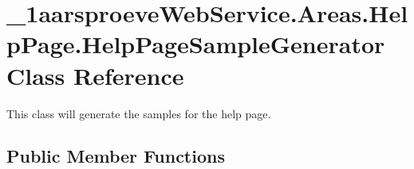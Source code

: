 \hypertarget{class__1aarsproeve_web_service_1_1_areas_1_1_help_page_1_1_help_page_sample_generator}{}\section{\+\_\+1aarsproeve\+Web\+Service.\+Areas.\+Help\+Page.\+Help\+Page\+Sample\+Generator Class Reference}
\label{class__1aarsproeve_web_service_1_1_areas_1_1_help_page_1_1_help_page_sample_generator}


This class will generate the samples for the help page.  


\subsection*{Public Member Functions}
